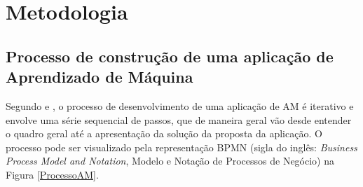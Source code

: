 \chapter{Metodologia}
\section{Processo de construção de uma aplicação de Aprendizado de Máquina}

Segundo  e , o processo de desenvolvimento de uma aplicação de AM é iterativo e envolve uma série sequencial de passos, que de maneira geral vão desde entender o quadro geral até a apresentação da solução da proposta da aplicação. O processo pode ser visualizado pela representação BPMN (sigla do inglês: \textit{Business Process Model and Notation}, Modelo e Notação de Processos de Negócio) na Figura \ref{ProcessoAM}.


